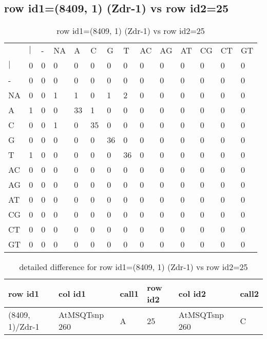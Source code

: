 \subsection{row id1=(8409, 1) (Zdr-1) vs row id2=25}
\begin{center}
\begin{longtable}{|l|l|l|l|l|l|l|l|l|l|l|l|l|l|}
\caption{row id1=(8409, 1) (Zdr-1) vs row id2=25} \label{table_dm478}\\
\hline
\\
\hline
&$|$&-&NA&A&C&G&T&AC&AG&AT&CG&CT&GT\\
$|$&0&0&0&0&0&0&0&0&0&0&0&0&0\\
-&0&0&0&0&0&0&0&0&0&0&0&0&0\\
NA&0&0&1&1&0&1&2&0&0&0&0&0&0\\
A&1&0&0&33&1&0&0&0&0&0&0&0&0\\
C&0&0&1&0&35&0&0&0&0&0&0&0&0\\
G&0&0&0&0&0&36&0&0&0&0&0&0&0\\
T&1&0&0&0&0&0&36&0&0&0&0&0&0\\
AC&0&0&0&0&0&0&0&0&0&0&0&0&0\\
AG&0&0&0&0&0&0&0&0&0&0&0&0&0\\
AT&0&0&0&0&0&0&0&0&0&0&0&0&0\\
CG&0&0&0&0&0&0&0&0&0&0&0&0&0\\
CT&0&0&0&0&0&0&0&0&0&0&0&0&0\\
GT&0&0&0&0&0&0&0&0&0&0&0&0&0\\
\hline
\end{longtable}
\end{center}

\begin{center}
\begin{longtable}{|l|l|l|l|l|l|}
\caption{detailed difference for row id1=(8409, 1) (Zdr-1) vs row id2=25} \label{table_dm479}\\
\hline
row id1&col id1&call1&row id2&col id2&call2\\
\hline
(8409, 1)/Zdr-1&AtMSQTsnp 260&A&25&AtMSQTsnp 260&C\\
\hline
\end{longtable}
\end{center}


